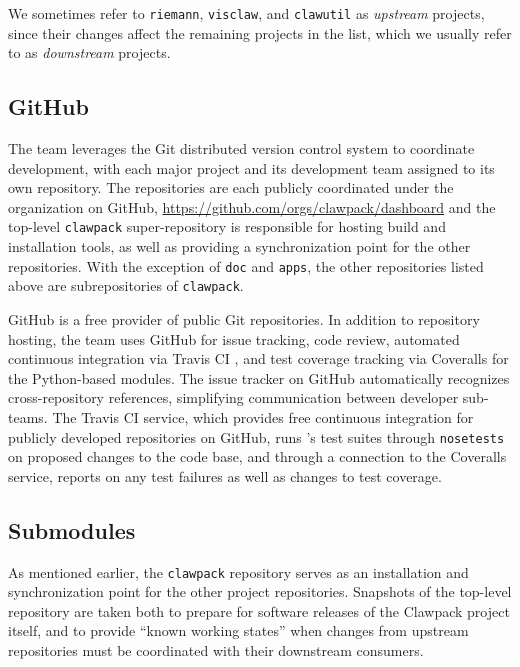 We sometimes refer to \texttt{riemann}, \texttt{visclaw}, and
\texttt{clawutil} as
\textit{upstream} projects, since their changes affect the
remaining projects in the list, which we usually refer to as
\textit{downstream} projects.

\subsection{GitHub}

The \clawpack team leverages the Git distributed version control system
to coordinate development, with each major project and its development
team assigned to its own repository.  The repositories are each
publicly coordinated under the \clawpack organization on GitHub, 
\url{https://github.com/orgs/clawpack/dashboard} and the
top-level \texttt{clawpack} super-repository is responsible for hosting
build and installation tools, as well as providing a synchronization
point for the other repositories.  With the exception of \texttt{doc} and \texttt{apps}, the other repositories listed above are subrepositories of \texttt{clawpack}. 

GitHub is a free provider of public Git repositories.  In addition to
repository hosting, the \clawpack team uses GitHub for issue tracking,
code review, automated continuous integration via Travis CI
\cite{travis}, and test coverage tracking via Coveralls
\cite{coveralls} for the Python-based modules.  The issue tracker on
GitHub automatically recognizes cross-repository references,
simplifying communication between \clawpack developer sub-teams.  The
Travis CI service, which provides free continuous integration for
publicly developed repositories on GitHub, runs \clawpack's test
suites through \texttt{nosetests} \cite{nosetests} on proposed changes
to the code base, and through a connection to the Coveralls service,
reports on any test failures as well as changes to test coverage.

\subsection{Submodules}

As mentioned earlier, the \texttt{clawpack} repository serves as an
installation and synchronization point for the other project repositories.
Snapshots of the top-level repository are taken both to prepare for
software releases of the Clawpack project itself, and to provide
``known working states'' when changes from upstream repositories must
be coordinated with their downstream consumers.

